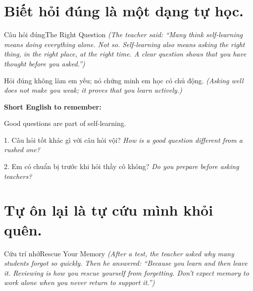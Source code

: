 \section{Biết hỏi đúng là một dạng tự học.}
\begin{truyen}{Câu hỏi đúng}{The Right Question}
\textit{(The teacher said: ``Many think self-learning means doing everything alone. Not so. Self-learning also means asking the right thing, in the right place, at the right time. A clear question shows that you have thought before you asked.'')}
\end{truyen}

\begin{baihoc}
Hỏi đúng không làm em yếu; nó chứng minh em học có chủ động.
\textit{(Asking well does not make you weak; it proves that you learn actively.)}
\end{baihoc}

\begin{ghinhoanh}
\textbf{Short English to remember:}

Good questions are part of self-learning.

\end{ghinhoanh}

\begin{tuhocnhanh}
1. Câu hỏi tốt khác gì với câu hỏi vội? \textit{How is a good question different from a rushed one?}

2. Em có chuẩn bị trước khi hỏi thầy cô không? \textit{Do you prepare before asking teachers?}
\end{tuhocnhanh}
\ngancach

\section{Tự ôn lại là tự cứu mình khỏi quên.}
\begin{truyen}{Cứu trí nhớ}{Rescue Your Memory}
\textit{(After a test, the teacher asked why many students forgot so quickly. Then he answered: ``Because you learn and then leave it. Reviewing is how you rescue yourself from forgetting. Don't expect memory to work alone when you never return to support it.'')}
\end{truyen}

